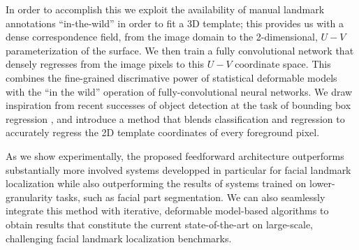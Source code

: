 
In order to accomplish this 
 we exploit the availability of manual landmark annotations ``in-the-wild'' in order to fit a 3D template; this provides us with a dense correspondence field, from the image domain to the 2-dimensional, $U-V$ parameterization of the surface. We then train a fully convolutional network that densely regresses from the image pixels to this $U-V$ coordinate space. This combines the fine-grained discrimative power of statistical deformable models with the ``in the wild'' operation of fully-convolutional neural networks. 
 We draw inspiration from recent successes of object detection at the task of bounding box regression \citep{ren2015faster}, and 
 introduce a method that blends classification and regression to accurately regress the 2D template coordinates of every foreground pixel.
 
 As we show experimentally, the proposed  feedforward architecture outperforms substantially more involved systems developped in particular for facial landmark localization while also outperforming the results of systems trained on lower-granularity tasks, such as facial part segmentation.
We can also seamlessly integrate this method with iterative, deformable model-based algorithms to obtain results that constitute the current state-of-the-art on large-scale, challenging facial landmark localization benchmarks.

